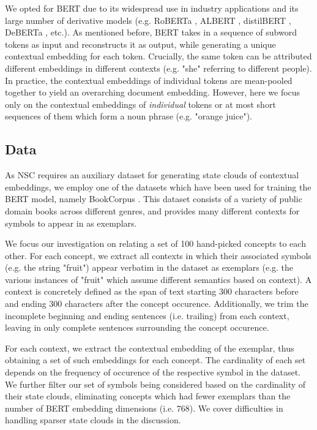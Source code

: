 We opted for BERT due to its widespread use in industry applications and its large number of derivative models (e.g. RoBERTa \citep{liu_roberta_2019}, ALBERT \citep{lan_albert_2020}, distilBERT \citep{sanh_distilbert_2020}, DeBERTa \citep{he_deberta_2021}, etc.). As mentioned before, BERT takes in a sequence of subword tokens as input and reconstructs it as output, while generating a unique contextual embedding for each token. Crucially, the same token can be attributed different embeddings in different contexts (e.g. "she" referring to different people). In practice, the contextual embeddings of individual tokens are mean-pooled together to yield an overarching document embedding. However, here we focus only on the contextual embeddings of \textit{individual} tokens or at most short sequences of them which form a noun phrase (e.g. "orange juice").

\subsection{Data}

As NSC requires an auxiliary dataset for generating state clouds of contextual embeddings, we employ one of the datasets which have been used for training the BERT model, namely BookCorpus \citep{devlin_bert_nodate}. This dataset consists of a variety of public domain books across different genres, and provides many different contexts for symbols to appear in as exemplars.

We focus our investigation on relating a set of 100 hand-picked concepts to each other. For each concept, we extract all contexts in which their associated symbols (e.g. the string "fruit") appear verbatim in the dataset as exemplars (e.g. the various instances of "fruit" which assume different semantics based on context). A context is concretely defined as the span of text starting 300 characters before and ending 300 characters after the concept occurence. Additionally, we trim the incomplete beginning and ending sentences (i.e. trailing) from each context, leaving in only complete sentences surrounding the concept occurence.

For each context, we extract the contextual embedding of the exemplar, thus obtaining a set of such embeddings for each concept. The cardinality of each set depends on the frequency of occurence of the respective symbol in the dataset. We further filter our set of symbols being considered based on the cardinality of their state clouds, eliminating concepts which had fewer exemplars than the number of BERT embedding dimensions (i.e. 768). We cover difficulties in handling sparser state clouds in the discussion.

